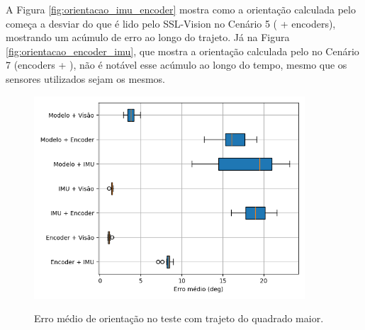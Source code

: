\documentclass[acronym, symbols, table]{fei}
\begin{document}
		A Figura \ref{fig:orientacao_imu_encoder} mostra como a orientação calculada pelo  começa a desviar do que é lido pelo SSL-Vision no Cenário 5 ( + encoders), mostrando um acúmulo de erro ao longo do trajeto. Já na Figura \ref{fig:orientacao_encoder_imu}, que mostra a orientação calculada pelo  no Cenário 7 (encoders + ), não é notável esse acúmulo ao longo do tempo, mesmo que os sensores utilizados sejam os mesmos.
	
		\begin{figure}[!htb]
			\centering
			\caption{Erro médio de orientação no teste com trajeto do quadrado maior.}
			\includegraphics[width=0.9\textwidth]{../Dados/Graficos-Resultados/erro_medio_orientacao_quadrado_maior.png}
			\label{fig:erro_medio_orientacao_quad_maior}
		\end{figure}
	
\end{document}
